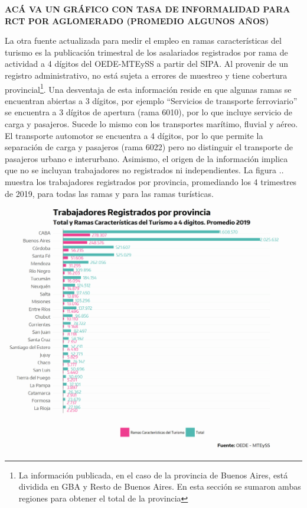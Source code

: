 \documentclass[
  openany]{book}
\begin{document}
\textbf{ACÁ VA UN GRÁFICO CON TASA DE INFORMALIDAD PARA RCT POR AGLOMERADO (PROMEDIO ALGUNOS AÑOS)}

La otra fuente actualizada para medir el empleo en ramas características del turismo es la publicación trimestral de los asalariados registrados por rama de actividad a 4 dígitos del OEDE-MTEySS a partir del SIPA. Al provenir de un registro administrativo, no está sujeta a errores de muestreo y tiene cobertura provincial\footnote{La información publicada, en el caso de la provincia de Buenos Aires, está dividida en GBA y Resto de Buenos Aires. En esta sección se sumaron ambas regiones para obtener el total de la provincia}. Una desventaja de esta información reside en que algunas ramas se encuentran abiertas a 3 dígitos, por ejemplo ``Servicios de transporte ferroviario'' se encuentra a 3 dígitos de apertura (rama 6010), por lo que incluye servicio de carga y pasajeros. Sucede lo mismo con los transportes marítimo, fluvial y aéreo. El transporte automotor se encuentra a 4 dígitos, por lo que permite la separación de carga y pasajeros (rama 6022) pero no distinguir el transporte de pasajeros urbano e interurbano.
Asimismo, el origen de la información implica que no se incluyan trabajadores no registrados ni independientes. La figura .. muestra los trabajadores registrados por provincia, promediando los 4 trimestres de 2019, para todas las ramas y para las ramas turísticas.

\begin{center}\includegraphics[width=1\linewidth]{imagenes/empleo.prov} \end{center}
\end{document}
